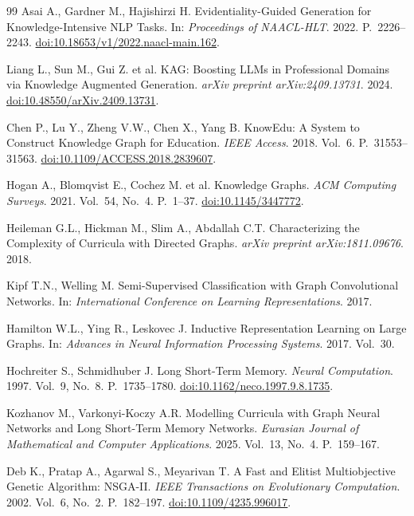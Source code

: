 \documentclass[twoside,11pt]{article}
\begin{document}
\begin{thebibliography}{99}
Asai A., Gardner M., Hajishirzi H.
Evidentiality-Guided Generation for Knowledge-Intensive NLP Tasks.
In: \textit{Proceedings of NAACL-HLT}. 2022. P.~2226--2243.
\href{https://doi.org/10.18653/v1/2022.naacl-main.162}{doi:10.18653/v1/2022.naacl-main.162}.

Liang L., Sun M., Gui Z. et al.
KAG: Boosting LLMs in Professional Domains via Knowledge Augmented Generation.
\textit{arXiv preprint arXiv:2409.13731}. 2024.
\href{https://doi.org/10.48550/arXiv.2409.13731}{doi:10.48550/arXiv.2409.13731}.

Chen P., Lu Y., Zheng V.W., Chen X., Yang B.
KnowEdu: A System to Construct Knowledge Graph for Education.
\textit{IEEE Access}. 2018. Vol.~6. P.~31553--31563.
\href{https://doi.org/10.1109/ACCESS.2018.2839607}{doi:10.1109/ACCESS.2018.2839607}.

Hogan A., Blomqvist E., Cochez M. et al.
Knowledge Graphs.
\textit{ACM Computing Surveys}. 2021. Vol.~54, No.~4. P.~1--37.
\href{https://doi.org/10.1145/3447772}{doi:10.1145/3447772}.

Heileman G.L., Hickman M., Slim A., Abdallah C.T.
Characterizing the Complexity of Curricula with Directed Graphs.
\textit{arXiv preprint arXiv:1811.09676}. 2018.

Kipf T.N., Welling M.
Semi-Supervised Classification with Graph Convolutional Networks.
In: \textit{International Conference on Learning Representations}. 2017.

Hamilton W.L., Ying R., Leskovec J.
Inductive Representation Learning on Large Graphs.
In: \textit{Advances in Neural Information Processing Systems}. 2017. Vol.~30.

Hochreiter S., Schmidhuber J.
Long Short-Term Memory.
\textit{Neural Computation}. 1997. Vol.~9, No.~8. P.~1735--1780.
\href{https://doi.org/10.1162/neco.1997.9.8.1735}{doi:10.1162/neco.1997.9.8.1735}.

Kozhanov M., Varkonyi-Koczy A.R.
Modelling Curricula with Graph Neural Networks and Long Short-Term Memory Networks.
\textit{Eurasian Journal of Mathematical and Computer Applications}. 2025. Vol.~13, No.~4. P.~159--167.

Deb K., Pratap A., Agarwal S., Meyarivan T.
A Fast and Elitist Multiobjective Genetic Algorithm: NSGA-II.
\textit{IEEE Transactions on Evolutionary Computation}. 2002. Vol.~6, No.~2. P.~182--197.
\href{https://doi.org/10.1109/4235.996017}{doi:10.1109/4235.996017}.


\end{thebibliography}
\end{document}
